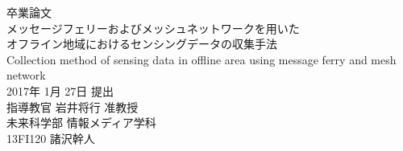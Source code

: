 \documentclass{jsarticle}
\begin{document}
\thispagestyle{empty}
\begin{center}
\vspace*{-1cm}
\Huge{卒業論文}\\
\vspace{1cm}
\LARGE{メッセージフェリーおよびメッシュネットワークを用いた\\オフライン地域におけるセンシングデータの収集手法}\\
\vspace{0.2cm}
\large{Collection method of sensing data in offline area using message ferry and mesh network}\\
\vspace{2cm}
\Large{2017年 1月 27日 提出}\\
\vspace{2cm}
\LARGE{指導教官 岩井将行 准教授}\\
\vspace{1cm}
\LARGE{未来科学部 情報メディア学科}\\
\vspace{1cm}
\huge{13FI120 諸沢幹人}\\
\end{center}
\end{document}
